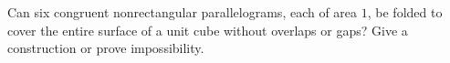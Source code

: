 Can six congruent nonrectangular parallelograms, each of area $1$, be folded to cover the entire surface of a unit cube without overlaps or gaps? Give a construction or prove impossibility.
